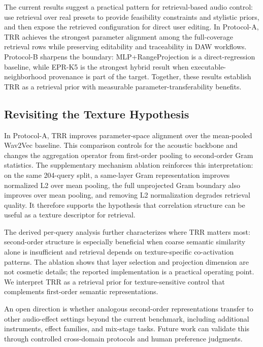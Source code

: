 The current results suggest a practical pattern for retrieval-based audio control: use retrieval over real presets to provide feasibility constraints and stylistic priors, and then expose the retrieved configuration for direct user editing. In Protocol-A, TRR achieves the strongest parameter alignment among the full-coverage retrieval rows while preserving editability and traceability in DAW workflows. Protocol-B sharpens the boundary: MLP+RangeProjection is a direct-regression baseline, while EPR-K5 is the strongest hybrid result when executable-neighborhood provenance is part of the target. Together, these results establish TRR as a retrieval prior with measurable parameter-transferability benefits.

\subsection{Revisiting the Texture Hypothesis}

In Protocol-A, TRR improves parameter-space alignment over the mean-pooled Wav2Vec baseline. This comparison controls for the acoustic backbone and changes the aggregation operator from first-order pooling to second-order Gram statistics. The supplementary mechanism ablation reinforces this interpretation: on the same 204-query split, a same-layer Gram representation improves normalized L2 over mean pooling, the full unprojected Gram boundary also improves over mean pooling, and removing L2 normalization degrades retrieval quality. It therefore supports the hypothesis that correlation structure can be useful as a texture descriptor for retrieval.

The derived per-query analysis further characterizes where TRR matters most: second-order structure is especially beneficial when coarse semantic similarity alone is insufficient and retrieval depends on texture-specific co-activation patterns. The ablation shows that layer selection and projection dimension are not cosmetic details; the reported implementation is a practical operating point. We interpret TRR as a retrieval prior for texture-sensitive control that complements first-order semantic representations.

An open direction is whether analogous second-order representations transfer to other audio-effect settings beyond the current benchmark, including additional instruments, effect families, and mix-stage tasks. Future work can validate this through controlled cross-domain protocols and human preference judgments.

